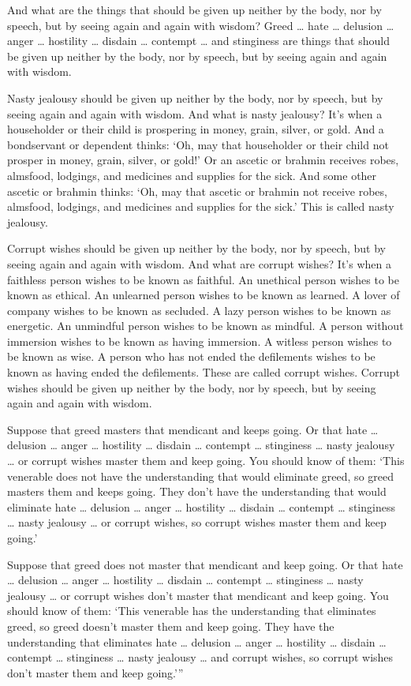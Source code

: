 \documentclass[12pt,openany]{book}%
\begin{document}
And what are the things that should be given up neither by the body, nor by speech, but by seeing again and again with wisdom? Greed … hate … delusion … anger … hostility … disdain … contempt … and stinginess are things that should be given up neither by the body, nor by speech, but by seeing again and again with wisdom. 

Nasty jealousy should be given up neither by the body, nor by speech, but by seeing again and again with wisdom. And what is nasty jealousy? It’s when a householder or their child is prospering in money, grain, silver, or gold. And a bondservant or dependent thinks: ‘Oh, may that householder or their child not prosper in money, grain, silver, or gold!’ Or an ascetic or brahmin receives robes, almsfood, lodgings, and medicines and supplies for the sick. And some other ascetic or brahmin thinks: ‘Oh, may that ascetic or brahmin not receive robes, almsfood, lodgings, and medicines and supplies for the sick.’ This is called nasty jealousy. 

Corrupt wishes should be given up neither by the body, nor by speech, but by seeing again and again with wisdom. And what are corrupt wishes? It’s when a faithless person wishes to be known as faithful. An unethical person wishes to be known as ethical. An unlearned person wishes to be known as learned. A lover of company wishes to be known as secluded. A lazy person wishes to be known as energetic. An unmindful person wishes to be known as mindful. A person without immersion wishes to be known as having immersion. A witless person wishes to be known as wise. A person who has not ended the defilements wishes to be known as having ended the defilements. These are called corrupt wishes. Corrupt wishes should be given up neither by the body, nor by speech, but by seeing again and again with wisdom. 

Suppose that greed masters that mendicant and keeps going. Or that hate … delusion … anger … hostility … disdain … contempt … stinginess … nasty jealousy … or corrupt wishes master them and keep going. You should know of them: ‘This venerable does not have the understanding that would eliminate greed, so greed masters them and keeps going. They don’t have the understanding that would eliminate hate … delusion … anger … hostility … disdain … contempt … stinginess … nasty jealousy … or corrupt wishes, so corrupt wishes master them and keep going.’ 

Suppose that greed does not master that mendicant and keep going. Or that hate … delusion … anger … hostility … disdain … contempt … stinginess … nasty jealousy … or corrupt wishes don’t master that mendicant and keep going. You should know of them: ‘This venerable has the understanding that eliminates greed, so greed doesn’t master them and keep going. They have the understanding that eliminates hate … delusion … anger … hostility … disdain … contempt … stinginess … nasty jealousy … and corrupt wishes, so corrupt wishes don’t master them and keep going.’” 
\end{document}

